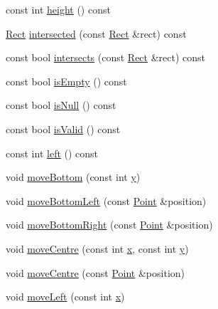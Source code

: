 \begin{DoxyCompactItemize}
\item 
const int \hyperlink{classprism_1_1geometry_1_1_rect_afe44f3f138f24808dba2bd807dbbe832}{height} () const 
\item 
\hyperlink{classprism_1_1geometry_1_1_rect}{Rect} \hyperlink{classprism_1_1geometry_1_1_rect_ad5637ecd9044e1aba9a2b20edfe64b0c}{intersected} (const \hyperlink{classprism_1_1geometry_1_1_rect}{Rect} \&rect) const 
\item 
const bool \hyperlink{classprism_1_1geometry_1_1_rect_a9ed407bdc1433493f8353e4e99a4802d}{intersects} (const \hyperlink{classprism_1_1geometry_1_1_rect}{Rect} \&rect) const 
\item 
const bool \hyperlink{classprism_1_1geometry_1_1_rect_a96fbe8d518599871cf914b2cdc2d84bc}{is\+Empty} () const 
\item 
const bool \hyperlink{classprism_1_1geometry_1_1_rect_a87f8a960d0e47a12d39f3631b8448bb7}{is\+Null} () const 
\item 
const bool \hyperlink{classprism_1_1geometry_1_1_rect_a448754593112b31dea56afd404007dea}{is\+Valid} () const 
\item 
const int \hyperlink{classprism_1_1geometry_1_1_rect_ae423bd72347e4d5363ee2679a7e28a5c}{left} () const 
\item 
void \hyperlink{classprism_1_1geometry_1_1_rect_a26169eca1c3bd117aee5529ecabdeab3}{move\+Bottom} (const int \hyperlink{classprism_1_1geometry_1_1_rect_aae87aa965538d7d9ba24050d111fbd0f}{y})
\item 
void \hyperlink{classprism_1_1geometry_1_1_rect_a6c93e7aa0cf76e483dd9844ea0c0ae92}{move\+Bottom\+Left} (const \hyperlink{classprism_1_1geometry_1_1_point}{Point} \&position)
\item 
void \hyperlink{classprism_1_1geometry_1_1_rect_a7f1e4141d8879ce54fc45e6005146a97}{move\+Bottom\+Right} (const \hyperlink{classprism_1_1geometry_1_1_point}{Point} \&position)
\item 
void \hyperlink{classprism_1_1geometry_1_1_rect_af5a0e47f3771365467b596d069b1137f}{move\+Centre} (const int \hyperlink{classprism_1_1geometry_1_1_rect_a7ecf0e30c1485b8b6ed1c83625e0ce4c}{x}, const int \hyperlink{classprism_1_1geometry_1_1_rect_aae87aa965538d7d9ba24050d111fbd0f}{y})
\item 
void \hyperlink{classprism_1_1geometry_1_1_rect_ad26400adfe91b53bc35eb808555e17d2}{move\+Centre} (const \hyperlink{classprism_1_1geometry_1_1_point}{Point} \&position)
\item 
void \hyperlink{classprism_1_1geometry_1_1_rect_a69e1fde9419a8aa4924cf301eca10a2a}{move\+Left} (const int \hyperlink{classprism_1_1geometry_1_1_rect_a7ecf0e30c1485b8b6ed1c83625e0ce4c}{x})

\end{DoxyCompactItemize}
